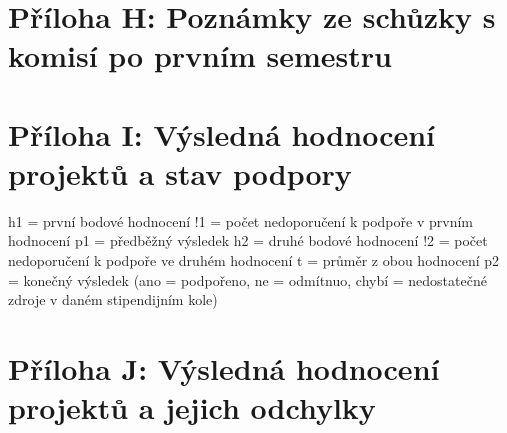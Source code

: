 \cleartoleftpage
\section{Příloha H: Poznámky ze schůzky s komisí po prvním semestru}


\cleartoleftpage
\section{Příloha I: Výsledná hodnocení projektů a stav podpory}

h1 = první bodové hodnocení \newline
!1 = počet nedoporučení k podpoře v prvním hodnocení \newline
p1 = předběžný výsledek \newline
h2 = druhé bodové hodnocení \newline
!2 = počet nedoporučení k podpoře ve druhém hodnocení
t = průměr z obou hodnocení \newline
p2 = konečný výsledek (ano = podpořeno, ne = odmítnuo, chybí = nedostatečné zdroje v daném stipendijním kole)


\cleartoleftpage
\section{Příloha J: Výsledná hodnocení projektů a jejich odchylky}








